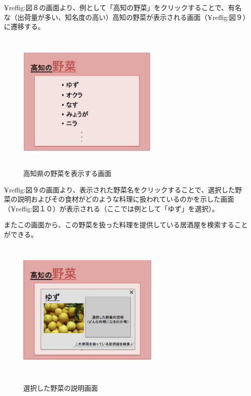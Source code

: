 \documentclass[a4j,titlepage]{jarticle}
\begin{document}
¥ref{fig:図８}の画面より、例として「高知の野菜」をクリックすることで、有名な（出荷量が多い、知名度の高い）高知の野菜が表示される画面（¥ref{fig:図９}）に遷移する。
\clearpage
\begin {figure}[!htbp]
    \begin{center}
    \includegraphics [height=7cm, width=7cm]{9.eps}
    \caption {高知県の野菜を表示する画面}
    \label {fig:9}
    \end{center}
\end {figure}



¥ref{fig:図９}の画面より、表示された野菜名をクリックすることで、選択した野菜の説明およびその食材がどのような料理に扱われているのかを示した画面（¥ref{fig:図１０}）が表示される（ここでは例として「ゆず」を選択）。



またこの画面から、この野菜を扱った料理を提供している居酒屋を検索することができる。



\begin {figure}[!htbp]
    \begin{center}
    \includegraphics [height=7cm, width=7cm]{10.eps}
　　    \caption {選択した野菜の説明画面}
    \label {fig:10}
    \end{center}
\end {figure}
\end{document}
